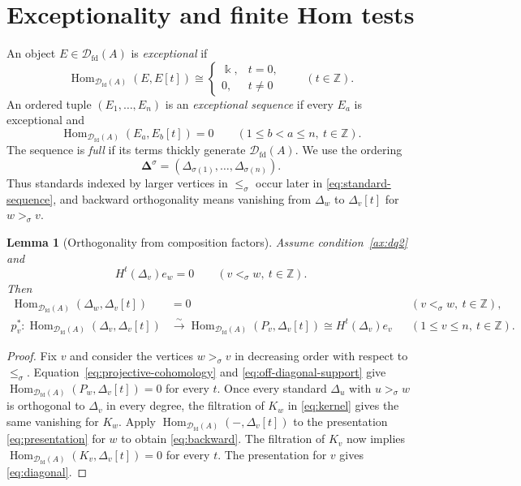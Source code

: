 \documentclass[11pt,a4paper]{article}
\newcommand{\defn}[1]{\textsl{\color{darkblue} #1}}
\newcommand{\D}{\mathcal D}
\newcommand{\ZZ}{\mathbb{Z}}
\newcommand{\std}{\Delta}
\DeclareMathOperator{\fd}{fd}
\DeclareMathOperator{\Hom}{Hom}
\theoremstyle{plain}
\newtheorem{lemma}[theorem]{Lemma}
\theoremstyle{definition}
\numberwithin{equation}{section}
\begin{document}
\section{Exceptionality and finite Hom tests}\label{sec:exceptionality}

An object $E\in\D_{\fd}(A)$ is \defn{exceptional} if
\begin{equation}\label{eq:exceptional}
 \Hom_{\D_{\fd}(A)}(E,E[t])\cong
 \begin{cases}\Bbbk,&t=0,\\0,&t\neq0\end{cases}
 \qquad(t\in\ZZ).
\end{equation}
An ordered tuple $(E_1,\ldots,E_n)$ is an
\defn{exceptional sequence} if every $E_a$ is exceptional and
\begin{equation}\label{eq:exceptional-sequence}
 \Hom_{\D_{\fd}(A)}(E_a,E_b[t])=0
 \qquad(1\leq b<a\leq n,\ t\in\ZZ).
\end{equation}
The sequence is \defn{full} if its terms thickly generate
$\D_{\fd}(A)$. We use the ordering
\begin{equation}\label{eq:standard-sequence}
 \boldsymbol\std^\sigma=(\std_{\sigma(1)},\ldots,\std_{\sigma(n)}).
\end{equation}
Thus standards indexed by larger vertices in $\leq_\sigma$ occur
later in \eqref{eq:standard-sequence}, and backward orthogonality means
vanishing from $\std_w$ to $\std_v[t]$ for $w>_\sigma v$.

\begin{lemma}[Orthogonality from composition factors]
\label{prop:orthogonality}
Assume condition~\ref{ax:dq2} and
\begin{equation}\label{eq:off-diagonal-support}
 H^t(\std_v)e_w=0\qquad(v<_\sigma w,\ t\in\ZZ).
\end{equation}
Then
\begin{align}
 \Hom_{\D_{\fd}(A)}(\std_w,\std_v[t])&=0
 &&(v<_\sigma w,\ t\in\ZZ),\label{eq:backward}\\
 p_v^*:\Hom_{\D_{\fd}(A)}(\std_v,\std_v[t])
 &\xrightarrow{\sim}\Hom_{\D_{\fd}(A)}(P_v,\std_v[t])
 \cong H^t(\std_v)e_v
 &&(1\leq v\leq n,\ t\in\ZZ).
 \label{eq:diagonal}
\end{align}
\end{lemma}
\begin{proof}
Fix $v$ and consider the vertices $w>_\sigma v$ in decreasing
order with respect to $\leq_\sigma$.
Equation~\eqref{eq:projective-cohomology} and
\eqref{eq:off-diagonal-support} give
$\Hom_{\D_{\fd}(A)}(P_w,\std_v[t])=0$ for every $t$.
Once every standard $\std_u$ with $u>_\sigma w$ is orthogonal to
$\std_v$ in every degree, the filtration of $K_w$ in
\eqref{eq:kernel} gives the same vanishing for $K_w$.
Apply $\Hom_{\D_{\fd}(A)}(-,\std_v[t])$ to the presentation
\eqref{eq:presentation} for $w$ to obtain \eqref{eq:backward}.
The filtration of $K_v$ now implies
$\Hom_{\D_{\fd}(A)}(K_v,\std_v[t])=0$ for every $t$.
The presentation for $v$ gives \eqref{eq:diagonal}.
\end{proof}
\end{document}
